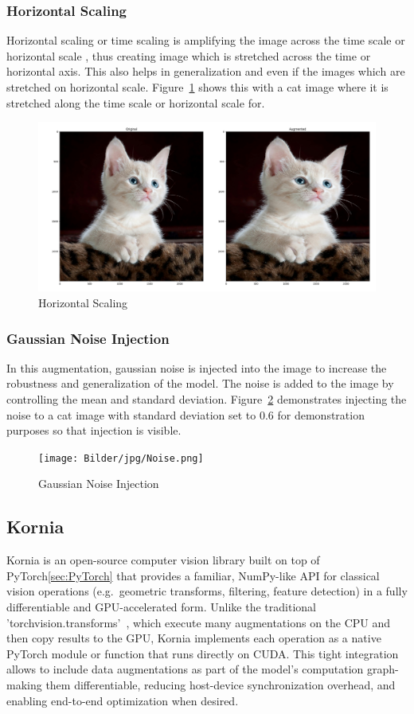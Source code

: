 \subsubsection{Horizontal Scaling}
Horizontal scaling or time scaling is amplifying the image across the time scale or horizontal scale , thus creating image which is stretched across the time or horizontal axis. This also helps in generalization and even if the images which are stretched on horizontal scale. Figure~\ref{time} shows this with a cat image where it is stretched along the time scale or horizontal scale for. 

\begin{figure}[h]
    \centering
    \includegraphics[width=0.6\linewidth]{Bilder/jpg/affine.png}
    \caption{Horizontal Scaling~\cite{kitten}}
    \label{time}
\end{figure}

\subsubsection{Gaussian Noise Injection}
In this augmentation, gaussian noise is injected into the image to increase the robustness and generalization of the model. The noise is added to the image by controlling the mean and standard deviation. Figure~\ref{noise} demonstrates injecting the noise to a cat image with standard deviation set to 0.6 for demonstration purposes so that injection is visible.

\begin{figure}[h]
  \centering
  \texttt{[image: Bilder/jpg/Noise.png]}
  \caption{Gaussian Noise Injection~\cite{kitten}}
  \label{noise}
\end{figure}

\subsection{Kornia}

Kornia is an open-source computer vision library built on top of PyTorch\ref{sec:PyTorch} that provides a familiar, NumPy-like API for classical vision operations (e.g.\ geometric transforms, filtering, feature detection) in a fully differentiable and GPU-accelerated form. Unlike the traditional 'torchvision.transforms'~\cite{torchvision2024}, which execute many augmentations on the CPU and then copy results to the GPU, Kornia implements each operation as a native PyTorch module or function that runs directly on CUDA. This tight integration allows to include data augmentations as part of the model's computation graph-making them differentiable, reducing host-device synchronization overhead, and enabling end-to-end optimization when desired.

